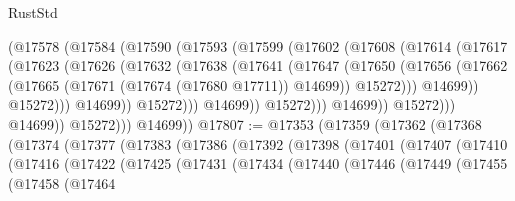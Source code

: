 \begin{lexlean}{RustStd}
\begin{coremodule}
                            (@17578
                              (@17584
                                (@17590
                                  (@17593
                                    (@17599
                                      (@17602
                                        (@17608
                                          (@17614
                                            (@17617
                                              (@17623
                                                (@17626
                                                  (@17632
                                                    (@17638
                                                      (@17641
                                                        (@17647
                                                          (@17650
                                                            (@17656
                                                              (@17662
                                                                (@17665
                                                                  (@17671
                                                                    (@17674 (@17680 @17711))
                                                                    @14699))
                                                                @15272)))
                                                          @14699))
                                                      @15272)))
                                                @14699))
                                            @15272)))
                                      @14699))
                                  @15272)))
                            @14699))
                        @15272)))
                  @14699))
              @15272)))
        @14699))
@17807 := @17353
    (@17359
      (@17362
        (@17368
          (@17374
            (@17377
              (@17383
                (@17386
                  (@17392
                    (@17398
                      (@17401
                        (@17407
                          (@17410
                            (@17416
                              (@17422
                                (@17425
                                  (@17431
                                    (@17434
                                      (@17440
                                        (@17446
                                          (@17449
                                            (@17455
                                              (@17458
                                                (@17464

\end{coremodule}
\end{lexlean}
